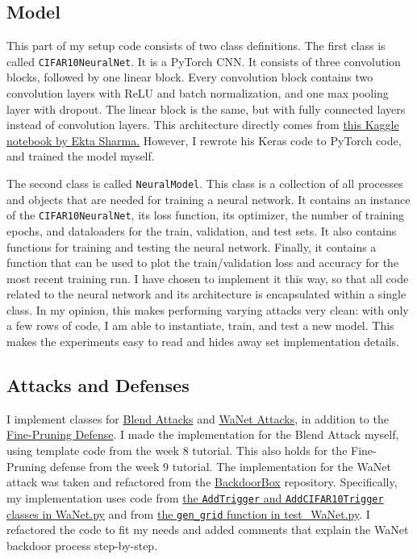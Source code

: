 \documentclass{article}
\begin{document}
\subsection{Model}
This part of my setup code consists of two class definitions. 
The first class is called \texttt{CIFAR10NeuralNet}.
It is a PyTorch CNN.
It consists of three convolution blocks, followed by one linear block.
Every convolution block contains two convolution layers with ReLU and batch normalization, and one max pooling layer with dropout.
The linear block is the same, but with fully connected layers instead of convolution layers.
This architecture directly comes from \href{https://www.kaggle.com/code/ektasharma/simple-cifar10-cnn-keras-code-with-88-accuracy#Building-the-CNN-Model-using-Keras}{this Kaggle notebook by Ekta Sharma.}
However, I rewrote his Keras code to PyTorch code, and trained the model myself.

The second class is called \texttt{NeuralModel}.
This class is a collection of all processes and objects that are needed for training a neural network.
It contains an instance of the \texttt{CIFAR10NeuralNet}, its loss function, its optimizer, the number of training epochs, and dataloaders for the train, validation, and test sets.
It also contains functions for training and testing the neural network.
Finally, it contains a function that can be used to plot the train/validation loss and accuracy for the most recent training run.
I have chosen to implement it this way, so that all code related to the neural network and its architecture is encapsulated within a single class.
In my opinion, this makes performing varying attacks very clean: with only a few rows of code, I am able to instantiate, train, and test a new model.
This makes the experiments easy to read and hides away set implementation details.

\subsection{Attacks and Defenses}
I implement classes for \href{https://arxiv.org/pdf/1712.05526}{Blend Attacks} and \href{https://arxiv.org/pdf/2102.10369}{WaNet Attacks}, in addition to the \href{https://arxiv.org/pdf/1805.12185}{Fine-Pruning Defense}.
I made the implementation for the Blend Attack myself, using template code from the week 8 tutorial.
This also holds for the Fine-Pruning defense from the week 9 tutorial.
The implementation for the WaNet attack was taken and refactored from the \href{https://github.com/THUYimingLi/BackdoorBox/tree/main}{BackdoorBox} repository.
Specifically, my implementation uses code from \href{https://github.com/THUYimingLi/BackdoorBox/blob/main/core/attacks/WaNet.py#L172}{the \texttt{AddTrigger} and \texttt{AddCIFAR10Trigger} classes in WaNet.py} and from \href{https://github.com/THUYimingLi/BackdoorBox/blob/main/tests/test_WaNet.py#L24}{the \texttt{gen\_grid} function in test\_WaNet.py}.
I refactored the code to fit my needs and added comments that explain the WaNet backdoor process step-by-step.
\end{document}
